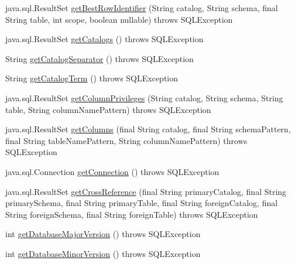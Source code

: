 \begin{DoxyCompactItemize}
\item 
java.\+sql.\+Result\+Set \mbox{\hyperlink{classcom_1_1mysql_1_1jdbc_1_1_database_meta_data_aa8a8a2f7924aa411eebaae653e1f3802}{get\+Best\+Row\+Identifier}} (String catalog, String schema, final String table, int scope, boolean nullable)  throws S\+Q\+L\+Exception 
\item 
java.\+sql.\+Result\+Set \mbox{\hyperlink{classcom_1_1mysql_1_1jdbc_1_1_database_meta_data_aead6a147747c6041b3dc03399b30bd9c}{get\+Catalogs}} ()  throws S\+Q\+L\+Exception 
\item 
String \mbox{\hyperlink{classcom_1_1mysql_1_1jdbc_1_1_database_meta_data_adf1e3db4691e9d18ece7d86f594b8125}{get\+Catalog\+Separator}} ()  throws S\+Q\+L\+Exception 
\item 
String \mbox{\hyperlink{classcom_1_1mysql_1_1jdbc_1_1_database_meta_data_a333983afb7152e0b032df87f472bd908}{get\+Catalog\+Term}} ()  throws S\+Q\+L\+Exception 
\item 
java.\+sql.\+Result\+Set \mbox{\hyperlink{classcom_1_1mysql_1_1jdbc_1_1_database_meta_data_aad5669e55c0db83ec88a8fd9c34a406c}{get\+Column\+Privileges}} (String catalog, String schema, String table, String column\+Name\+Pattern)  throws S\+Q\+L\+Exception 
\item 
java.\+sql.\+Result\+Set \mbox{\hyperlink{classcom_1_1mysql_1_1jdbc_1_1_database_meta_data_aa499f30e9c9222a702a504ad205d1802}{get\+Columns}} (final String catalog, final String schema\+Pattern, final String table\+Name\+Pattern, String column\+Name\+Pattern)  throws S\+Q\+L\+Exception 
\item 
java.\+sql.\+Connection \mbox{\hyperlink{classcom_1_1mysql_1_1jdbc_1_1_database_meta_data_a2bb28d7bc355528d8b56cf52c42e07fa}{get\+Connection}} ()  throws S\+Q\+L\+Exception 
\item 
java.\+sql.\+Result\+Set \mbox{\hyperlink{classcom_1_1mysql_1_1jdbc_1_1_database_meta_data_a0dfb6635800405515c2e66a71a50f235}{get\+Cross\+Reference}} (final String primary\+Catalog, final String primary\+Schema, final String primary\+Table, final String foreign\+Catalog, final String foreign\+Schema, final String foreign\+Table)  throws S\+Q\+L\+Exception 
\item 
int \mbox{\hyperlink{classcom_1_1mysql_1_1jdbc_1_1_database_meta_data_a07038a3d3e0462c3feaf334d78ad9f33}{get\+Database\+Major\+Version}} ()  throws S\+Q\+L\+Exception 
\item 
int \mbox{\hyperlink{classcom_1_1mysql_1_1jdbc_1_1_database_meta_data_a88061ad5314e1e575cb9ff8b5d781411}{get\+Database\+Minor\+Version}} ()  throws S\+Q\+L\+Exception 

\end{DoxyCompactItemize}

